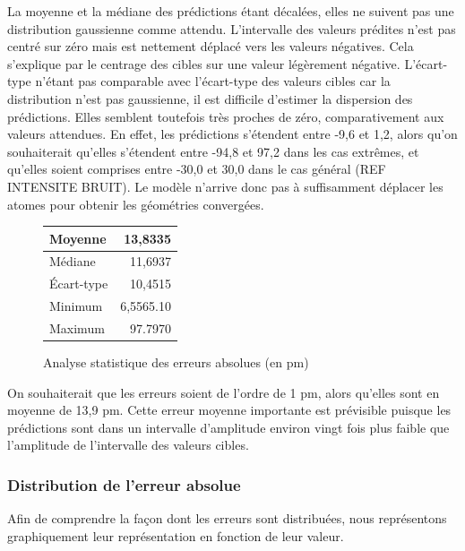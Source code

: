 \par La moyenne et la médiane des prédictions étant décalées, elles ne suivent pas une distribution gaussienne comme attendu. L'intervalle des valeurs prédites n'est pas centré sur zéro mais est nettement déplacé vers les valeurs négatives. Cela s'explique par le centrage des cibles sur une valeur légèrement négative.
L'écart-type n'étant pas comparable avec l'écart-type des valeurs cibles car la distribution n'est pas gaussienne, il est difficile d'estimer la dispersion des prédictions. Elles semblent toutefois très proches de zéro, comparativement aux valeurs attendues. En effet, les prédictions s'étendent entre -9,6 et 1,2, alors qu'on souhaiterait qu'elles s'étendent entre -94,8 et 97,2 dans les cas extrêmes, et qu'elles soient comprises entre -30,0 et 30,0 dans le cas général (REF INTENSITE BRUIT). Le modèle  n'arrive donc pas à suffisamment déplacer les atomes pour obtenir les géométries convergées.


\begin{figure}[!h]
	\centering
	\begin{tabular}{|l|r|}
		\hline
		Moyenne & 13,8335 \\ \hline
		Médiane & 11,6937 \\ \hline
		Écart-type & 10,4515 \\ \hline
		Minimum & 6,5565.10\up{-7} \\ \hline
		Maximum & 97.7970 \\ \hline
	\end{tabular}
	
	\caption{Analyse statistique des erreurs absolues (en pm)}
\end{figure}

\par On souhaiterait que les erreurs soient de l'ordre de 1 pm, alors qu'elles sont en moyenne de 13,9 pm. Cette erreur moyenne importante est prévisible puisque les prédictions sont dans un intervalle d'amplitude environ vingt fois plus faible que l'amplitude de l'intervalle des valeurs cibles.

\subsubsection{Distribution de l'erreur absolue}

Afin de comprendre la façon dont les erreurs sont distribuées, nous représentons graphiquement leur représentation en fonction de leur valeur.

